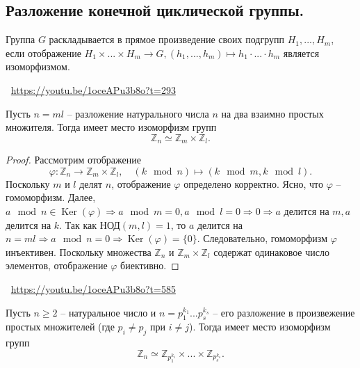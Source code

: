 \subsection{Разложение конечной циклической группы.}
\begin{definition}
    Группа $G$ раскладывается в прямое произведение своих подгрупп $H_1, ..., H_m$, если отображение $H_1 \times ... \times H_m \to G, (h_1, ..., h_m) \mapsto h_1 \cdot ... \cdot h_m$ является изоморфизмом.
\end{definition}
\large \faYoutube \normalsize $\>$ \url{https://youtu.be/1oceAPu3b8o?t=293}
\begin{theorem}
    Пусть $n = ml$ -- разложение натурального числа $n$ на два взаимно простых множителя. Тогда имеет место изоморфизм групп
    \[
        \mathbb{Z}_n \simeq \mathbb{Z}_m \times \mathbb{Z}_l.
    \]
    \begin{proof}
        Рассмотрим отображение
        \[
            \varphi : \mathbb{Z}_n \to \mathbb{Z}_m \times \mathbb{Z}_l,
            \quad
            (k \mod n) \mapsto (k \mod m, k \mod l).
        \]
        Поскольку $m$ и $l$ делят $n$, отображение $\varphi$ определено корректно. Ясно, что $\varphi$ -- гомоморфизм.
        \newline
        Далее, $a \mod n \in \operatorname{Ker}(\varphi) \Rightarrow a \mod m = 0, a \mod l = 0 \Rightarrow 0 \Rightarrow a $ делится на $ m, a $ делится на $ k$.
        Так как НОД$(m, l) = 1$, то $a$ делится на $n = ml \Rightarrow a \mod n = 0 \Rightarrow \operatorname{Ker}(\varphi) = \{0\}$. Следовательно, гомоморфизм $\varphi$ инъективен. Поскольку множества $\mathbb{Z}_n$ и $\mathbb{Z}_m \times \mathbb{Z}_l$ содержат одинаковое число элементов, отображение $\varphi$ биективно.
    \end{proof}
\end{theorem}
\large \faYoutube \normalsize $\>$ \url{https://youtu.be/1oceAPu3b8o?t=585}
\begin{consequence}
    Пусть $n \geqslant 2$ -- натуральное число и $n = p_1^{k_1} ... p_s^{k_s}$ -- его разложение в произвежение простых множителей (где $p_i \neq p_j$ при $i \neq j$). Тогда имеет место изоморфизм групп
    \[
        \mathbb{Z}_n \simeq \mathbb{Z}_{p_1^{k_1}} \times ... \times \mathbb{Z}_{p_s^{k_s}}.
    \]
\end{consequence}